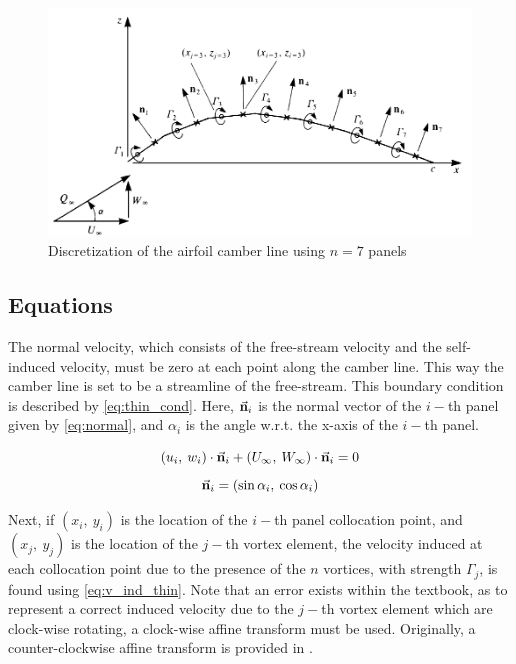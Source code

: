 \begin{figure}[H]
\centering
\includegraphics[width=.8\textwidth]{static/disc_camber.png}
\caption{Discretization of the airfoil camber line using $n=7$ panels \cite{katz_plotkin}}
\label{fig:discr_thin}
\end{figure}

\subsection{Equations}
The normal velocity, which consists of the free-stream velocity and the
self-induced velocity, must be zero at each point along the camber line. This
way the camber line is set to be a streamline of the free-stream. This
boundary condition is described by \autoref{eq:thin_cond}. Here,
$\vec{\bf{n}}_i$ is the normal vector of the $i-$th panel given by
\autoref{eq:normal}, and $\alpha_i$ is the angle w.r.t. the x-axis of the $i-$th
panel.

\begin{equation}
\label{eq:thin_cond}
    \left( u_i, \: w_i \right) \cdot \vec{\bf{n}}_i + \left( U_\infty,
    \: W_\infty \right) \cdot  \vec{\bf{n}}_i = 0
\end{equation}
\begin{equation}
\label{eq:normal}
    \vec{\bf{n}}_i = \left( \sin \alpha_i, \: \cos \alpha_i \right)
\end{equation}

Next, if $\left( x_i, \: y_i \right)$ is the location of the $i-$th panel
collocation point, and $\left( x_j, \: y_j \right)$ is the location of the
$j-$th vortex element, the velocity induced at each collocation point due to
the presence of the $n$ vortices, with strength $\Gamma_j$, is found using
\autoref{eq:v_ind_thin}. Note that an error exists within the textbook, as to
represent a correct induced velocity due to the $j-$th vortex element which are
clock-wise rotating, a clock-wise affine transform must be used. Originally, a
counter-clockwise affine transform is provided in \cite{katz_plotkin}.
\medskip

